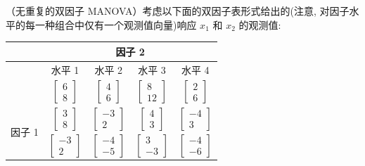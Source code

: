 \quad （无重复的双因子 MANOVA）考虑以下面的双因子表形式给出的(注意, 对因子水平的每一种组合中仅有一个观测值向量)响应 $x_1$ 和 $x_2$ 的观测值:

\begin{mvtable}
\begin{tabular}{c|cccc}
 & \multicolumn{4}{c}{因子 2}\\\midrule
 & 水平 1 & 水平 2 & 水平 3 & 水平 4\\\midrule
 & $\begin{bmatrix}6\\8\end{bmatrix}$ & $\begin{bmatrix}4\\6\end{bmatrix}$ & $\begin{bmatrix}8\\12\end{bmatrix}$ & $\begin{bmatrix}2\\6\end{bmatrix}$\\[10pt]
\multirow{3}{*}{因子 1} & $\begin{bmatrix}3\\8\end{bmatrix}$ & $\begin{bmatrix}-3\\2\end{bmatrix}$ & $\begin{bmatrix}4\\3\end{bmatrix}$ & $\begin{bmatrix}-4\\3\end{bmatrix}$\\[10pt]
 & $\begin{bmatrix}-3\\2\end{bmatrix}$ & $\begin{bmatrix}-4\\-5\end{bmatrix}$ & $\begin{bmatrix}3\\-3\end{bmatrix}$ & $\begin{bmatrix}-4\\-6\end{bmatrix}$
\end{tabular}
\end{mvtable}
